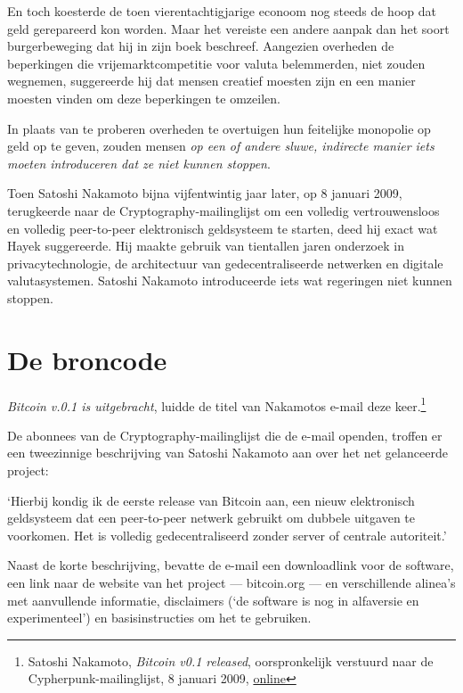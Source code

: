 \documentclass[
  a5paper,
  smalldemyvopaper,11pt,twoside,onecolumn,openright,extrafontsizes,
hidelinks]{memoir}
\renewenvironment{quote}%
               {\list{}{\rightmargin=.3cm\leftmargin=.3cm}%
                \itshape \item[]}%
               {\endlist}
\begin{document}
En toch koesterde de toen vierentachtigjarige econoom nog steeds de hoop
dat geld gerepareerd kon worden. Maar het vereiste een andere aanpak dan
het soort burgerbeweging dat hij in zijn boek beschreef. Aangezien
overheden de beperkingen die vrijemarktcompetitie voor valuta
belemmerden, niet zouden wegnemen, suggereerde hij dat mensen creatief
moesten zijn en een manier moesten vinden om deze beperkingen te
omzeilen.

In plaats van te proberen overheden te overtuigen hun feitelijke
monopolie op geld op te geven, zouden mensen \emph{op een of andere
sluwe, indirecte manier iets moeten introduceren dat ze niet kunnen
stoppen}.

Toen Satoshi Nakamoto bijna vijfentwintig jaar later, op 8 januari 2009,
terugkeerde naar de Cryptography-mailinglijst om een volledig
vertrouwensloos en volledig peer-to-peer elektronisch geldsysteem te
starten, deed hij exact wat Hayek suggereerde. Hij maakte gebruik van
tientallen jaren onderzoek in privacytechnologie, de architectuur van
gedecentraliseerde netwerken en digitale valutasystemen. Satoshi
Nakamoto introduceerde iets wat regeringen niet kunnen stoppen.

\section{De broncode}\label{de-broncode}

\emph{Bitcoin v.0.1 is uitgebracht}, luidde de titel van Nakamotos
e-mail deze keer.\footnote{Satoshi Nakamoto, \emph{Bitcoin v0.1
  released}, oorspronkelijk verstuurd naar de Cypherpunk-mailinglijst, 8
  januari 2009,
  \href{https://www.mail-archive.com/cryptography@metzdowd.com/msg10142.html}{online}}

De abonnees van de Cryptography-mailinglijst die de e-mail openden,
troffen er een tweezinnige beschrijving van Satoshi Nakamoto aan over
het net gelanceerde project:

\begin{quote}
`Hierbij kondig ik de eerste release van Bitcoin aan, een nieuw
elektronisch geldsysteem dat een peer-to-peer netwerk gebruikt om
dubbele uitgaven te voorkomen. Het is volledig gedecentraliseerd zonder
server of centrale autoriteit.'
\end{quote}

Naast de korte beschrijving, bevatte de e-mail een downloadlink voor de
software, een link naar de website van het project --- bitcoin.org ---
en verschillende alinea's met aanvullende informatie, disclaimers (`de
software is nog in alfaversie en experimenteel') en basisinstructies om
het te gebruiken.
\end{document}
